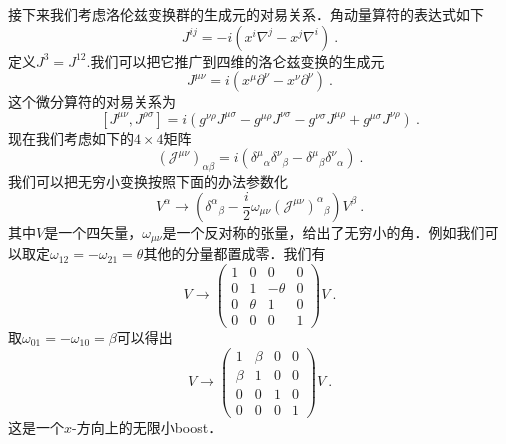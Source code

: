 接下来我们考虑洛伦兹变换群的生成元的对易关系．角动量算符的表达式如下
\begin{equation}
J^{ij} = -i (x^i\nabla^j- x^j\nabla^i)~.
\end{equation}
定义$J^3 = J^{12}$.我们可以把它推广到四维的洛仑兹变换的生成元
\begin{equation}
J^{\mu\nu} = i (x^\mu \partial^\nu - x^\nu \partial^\nu)~.
\end{equation}
这个微分算符的对易关系为
\begin{equation}\label{Dirac_eq4}
[J^{\mu\nu},J^{\rho\sigma}] = i (g^{\nu\rho}J^{\mu\sigma} - g^{\mu\rho}J^{\nu\sigma}-g^{\nu\sigma}J^{\mu\rho}+g^{\mu\sigma}J^{\nu\rho})~.
\end{equation}
现在我们考虑如下的$4\times 4$矩阵
\begin{equation}
(\mathcal J^{\mu\nu})_{\alpha\beta} = i (\delta^\mu{}_\alpha \delta^\nu{}_\beta - \delta^\mu{}_\beta \delta^\nu{}_\alpha)~.
\end{equation}
我们可以把无穷小变换按照下面的办法参数化
\begin{equation}
V^\alpha \rightarrow (\delta^\alpha{}_\beta - \frac{i}{2}\omega_{\mu\nu}(\mathcal J^{\mu\nu})^\alpha{}_\beta) V^\beta ~.
\end{equation}
其中$V$是一个四矢量，$\omega_{\mu\nu}$是一个反对称的张量，给出了无穷小的角．例如我们可以取定$\omega_{12}=-\omega_{21} = \theta$其他的分量都置成零．我们有
\begin{equation}
V \rightarrow \begin{pmatrix}
1 & 0 & 0 & 0 \\
0 & 1 & -\theta & 0 \\
0 & \theta & 1 & 0 \\
0 & 0 & 0 & 1
\end{pmatrix}
V~.
\end{equation}
取$\omega_{01} = -\omega_{10}=\beta$可以得出
\begin{equation}
V \rightarrow \begin{pmatrix}
1 & \beta & 0 & 0 \\
\beta & 1 & 0 & 0 \\
0 & 0 & 1 & 0 \\
0 & 0 & 0 & 1
\end{pmatrix}
V~.
\end{equation}
这是一个$x$-方向上的无限小boost．


